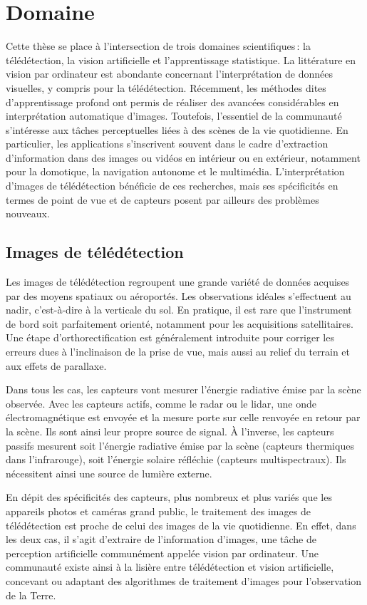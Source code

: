 \section{Domaine}

Cette thèse se place à l'intersection de trois domaines scientifiques\,: la télédétection, la vision artificielle et l'apprentissage statistique. La littérature en vision par ordinateur est abondante concernant l'interprétation de données visuelles, y compris pour la télédétection. Récemment, les méthodes dites d'apprentissage profond ont permis de réaliser des avancées considérables en interprétation automatique d'images. Toutefois, l'essentiel de la communauté s'intéresse aux tâches perceptuelles liées à des scènes de la vie quotidienne. En particulier, les applications s'inscrivent souvent dans le cadre d'extraction d'information dans des images ou vidéos en intérieur ou en extérieur, notamment pour la domotique, la navigation autonome et le multimédia. L'interprétation d'images de télédétection bénéficie de ces recherches, mais ses spécificités en termes de point de vue et de capteurs posent par ailleurs des problèmes nouveaux.

\subsection{Images de télédétection}

Les images de télédétection regroupent une grande variété de données acquises par des moyens spatiaux ou aéroportés. Les observations idéales s'effectuent au nadir, c'est-à-dire à la verticale du sol. En pratique, il est rare que l'instrument de bord soit parfaitement orienté, notamment pour les acquisitions satellitaires. Une étape d'orthorectification est généralement introduite pour corriger les erreurs dues à l'inclinaison de la prise de vue, mais aussi au relief du terrain et aux effets de parallaxe.

Dans tous les cas, les capteurs vont mesurer l'énergie radiative émise par la scène observée. Avec les capteurs actifs, comme le radar ou le lidar, une onde électromagnétique est envoyée et la mesure porte sur celle renvoyée en retour par la scène. Ils sont ainsi leur propre source de signal. À l'inverse, les capteurs passifs mesurent soit l'énergie radiative émise par la scène (capteurs thermiques dans l'infrarouge), soit l'énergie solaire réfléchie (capteurs multispectraux). Ils nécessitent ainsi une source de lumière externe.

En dépit des spécificités des capteurs, plus nombreux et plus variés que les appareils photos et caméras grand public, le traitement des images de télédétection est proche de celui des images de la vie quotidienne. En effet, dans les deux cas, il s'agit d'extraire de l'information d'images, une tâche de perception artificielle communément appelée vision par ordinateur. Une communauté existe ainsi à la lisière entre télédétection et vision artificielle, concevant ou adaptant des algorithmes de traitement d'images pour l'observation de la Terre.

